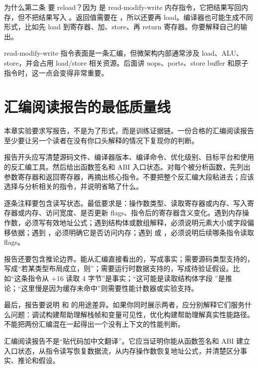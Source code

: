 为什么第二条  要 reload？因为  是 read-modify-write 内存指令，它把结果写回内存，但不把结果写入 。返回值需要在 ，所以还要再 load。编译器也可能生成不同形式，比如先 load 到寄存器、加、store、再 return 寄存器。你要解释自己的输出。

\begin{deepdive}
read-modify-write 指令表面是一条汇编，但微架构内部通常涉及 load、ALU、store，并会占用 load/store 相关资源。后面讲 uops、ports、store buffer 和原子指令时，这一点会变得非常重要。
\end{deepdive}

\section{汇编阅读报告的最低质量线}

本章实验要求写报告，不是为了形式，而是训练证据链。一份合格的汇编阅读报告至少要让另一个读者在没有你口头解释的情况下复现你的判断。

报告开头应写清楚源码文件、编译器版本、编译命令、优化级别、目标平台和使用的反汇编工具。然后给出函数签名和 ABI 入口状态。对每个被分析函数，先列出参数寄存器和返回寄存器，再摘出核心指令。不要把整个反汇编大段粘进去；应该选择与分析相关的指令，并说明省略了什么。

逐条注释要包含读写状态。最低要求是：操作数类型、读取寄存器或内存、写入寄存器或内存、访问宽度、是否更新 flags、指令后的寄存器含义变化。遇到内存操作数，必须写有效地址公式；遇到结构体或数组解释，必须说明元素大小或字段偏移依据；遇到 ，必须明确它是否访问内存；遇到  或 ，必须说明后续哪条指令读取 flags。

报告还要包含推论边界。能从汇编直接看出的，写成事实；需要源码类型支持的，写成“若某类型布局成立，则”；需要运行时数据支持的，写成待验证假设。比如“这条指令从 +16 读取 4 字节”是事实；“这可能是读取结构体字段 ”是推论；“这里慢是因为缓存未命中”则需要性能计数器或实验支持。

最后，报告要说明  和  的用途差异。如果你同时展示两者，应分别解释它们服务什么问题：调试构建帮助理解栈帧和变量可见性，优化构建帮助理解真实性能路径。不能把两份汇编混在一起得出一个没有上下文的性能判断。

\begin{keyidea}
汇编阅读报告不是“贴代码加中文翻译”。它应当证明你能从函数签名和 ABI 建立入口状态，从指令读写恢复数据流，从内存操作数恢复地址公式，并清楚区分事实、推论和假设。
\end{keyidea}

